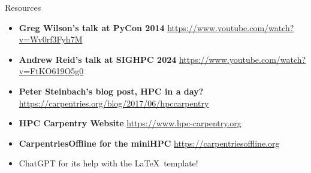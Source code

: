\begin{frame}{Resources}
	\begin{itemize}
		\item \textbf{Greg Wilson's talk at PyCon 2014} \url{https://www.youtube.com/watch?v=Wv0rf3Fyh7M}
		\item\textbf{ Andrew Reid's talk at SIGHPC 2024} \url{https://www.youtube.com/watch?v=FtKO619O5g0}
		\item\textbf{Peter Steinbach's blog post, HPC in a day?} \url{https://carpentries.org/blog/2017/06/hpccarpentry}
		\item\textbf{HPC Carpentry Website} 
		\url{https://www.hpc-carpentry.org}
		\item\textbf{CarpentriesOffline for the miniHPC}
		\url{https://carpentriesoffline.org}
		\item ChatGPT for its help with the \LaTeX \ template!
	\end{itemize}
\end{frame}
